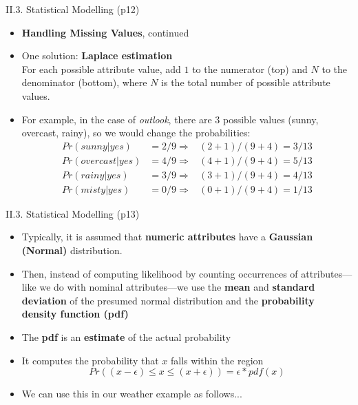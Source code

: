 \documentclass[handout]{beamer}
\newcommand{\strong}[1]{\textbf{\color{teal} #1}}
\newcommand{\stronger}[1]{\textbf{\color{purple} #1}}
\begin{document}
\begin{frame}{II.3. Statistical Modelling (p12)}
\begin{itemize}
\item \strong{Handling Missing Values}, continued
\item One solution: \stronger{Laplace estimation}\\
For each possible attribute value, add $1$ to the numerator (top) and $N$ to the denominator (bottom), where $N$ is the total number of possible attribute values.
\item For example, in the case of \emph{outlook}, there are $3$ possible values (sunny, overcast, rainy), so we would change the probabilities:
\begin{eqnarray*}
Pr(sunny|yes)    & = 2/9  \Rightarrow & (2+1) / (9+4) = 3/13 \\
Pr(overcast|yes) & = 4/9  \Rightarrow & (4+1) / (9+4) = 5/13 \\
Pr(rainy|yes)    & = 3/9  \Rightarrow & (3+1) / (9+4) = 4/13 \\
Pr(misty|yes)    & = 0/9  \Rightarrow & (0+1) / (9+4) = 1/13 
\end{eqnarray*}
\end{itemize}
\end{frame}
\begin{frame}{II.3. Statistical Modelling (p13)}
\begin{itemize}
\item Typically, it is assumed that \strong{numeric attributes} have a \strong{Gaussian (Normal)} distribution.
\item Then, instead of computing likelihood by counting occurrences of attributes---like we do with nominal attributes---we use the \strong{mean} and \strong{standard deviation} of the presumed normal distribution and the \stronger{probability density function (pdf)}
\item The \stronger{pdf} is an \strong{estimate} of the actual probability
\item It computes the probability that $x$ falls within the region
\[
Pr (( x - \epsilon ) \le x \le ( x + \epsilon )) = \epsilon * pdf(x)
\]
\item We can use this in our weather example as follows...
\end{itemize}
\end{frame}
\end{document}

